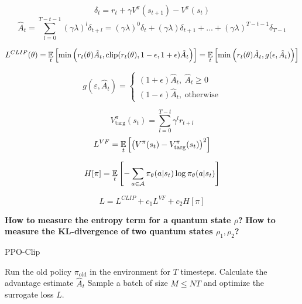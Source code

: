 \documentclass[12pt, a4paper,  nobibnotes]{article}
\begin{document}
\begin{equation}
    \delta_t = r_t + \gamma V^{\pi}(s_{t+1}) - V^{\pi}(s_t) 
\end{equation}
\begin{equation}
    \hat A_t = \sum\limits_{l=0}^{T-t-1} (\gamma\lambda)^{l}\delta_{t+l}
    = (\gamma\lambda)^0\delta_t + (\gamma\lambda)\delta_{t+1} + ... + (\gamma\lambda)^{T-t-1}\delta_{T-1}
\end{equation}

\begin{equation}
L^{CLIP}(\theta) = \underset{t}{\LARGE{\mathbb E}}\left[\min\left(r_t(\theta)\hat A_t, \textrm{clip}(r_t(\theta),1-\epsilon,1+\epsilon)\hat A_t\right)\right]
= \underset{t}{\LARGE{\mathbb E}} \left[
    \min\left( r_t(\theta)\hat A_t, g(\epsilon,\hat A_t)
    \right)
\right]
\end{equation}

\begin{equation}
g(\varepsilon, \hat A_t) = \begin{cases}
(1+\epsilon) \hat A_t, ~\hat A_t \geq 0 \\
(1-\epsilon) \hat A_t, ~\textrm{otherwise}
\end{cases}
\end{equation}

\begin{equation}
V_{\textrm{targ}}^{\pi}(s_t) = \sum\limits_{l=0}^{T-t} \gamma^lr_{t+l}
\end{equation}
\begin{equation}
L^{VF} = \underset{t}{\LARGE{\mathbb E}} \left[\left(V^{\pi}(s_t) - V_{\textrm{targ}}^{\pi}(s_t)\right)^2\right]
\end{equation}


\begin{equation}
H[\pi] = \underset{t}{\LARGE{\mathbb E}}\left[
-\sum\limits_{a\in \mathcal A}\pi_{\theta}(a|s_t)\log\pi_{\theta}(a|s_t)
\right]
\end{equation}

\begin{equation}
L = L^{CLIP} + c_1L^{VF} + c_2 H[\pi]
\end{equation}

\textbf{How to measure the entropy term for a quantum state $\rho$?}
\textbf{How to measure the KL-divergence of two quantum states $\rho_1,\rho_2$?}
\begin{algorithm}[H]
    \caption{PPO-Clip}
    \begin{algorithmic}[1]
                \State Run the old policy $\pi_{\textrm{old}}$ in the environment for $T$ timesteps.
                    \State Calculate the advantage estimate $\hat A_t$
                \EndFor
            \EndFor
                \State Sample a batch of size $M\leq NT$ and optimize the surrogate loss $L$.
            \EndFor
        \EndFor
    \EndProcedure
    \end{algorithmic}
\end{algorithm}
\end{document}
